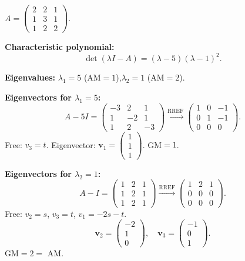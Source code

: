 \documentclass[12pt,a3paper]{article}
\begin{document}
 
\begin{tcolorbox}[enhanced,breakable,
  colback=cE!4,colframe=cE,boxrule=0.8pt,arc=5pt,
  title={\textbf{Answer --- Eigenvalues, Eigenvectors \& Diagonalizability}},
  fonttitle=\bfseries\color{white},colbacktitle=cE]
 
$A=\begin{pmatrix}2&2&1\\1&3&1\\1&2&2\end{pmatrix}$.
 
\textbf{Characteristic polynomial:}
\[
\det(\lambda I-A) = (\lambda-5)(\lambda-1)^2.
\]
 
\textbf{Eigenvalues:} $\lambda_1=5$ (AM$=1$),\quad $\lambda_2=1$ (AM$=2$).
 
\medskip
\textbf{Eigenvectors for $\lambda_1=5$:}
\[
A-5I=\begin{pmatrix}-3&2&1\\1&-2&1\\1&2&-3\end{pmatrix}
\xrightarrow{\mathrm{RREF}}
\begin{pmatrix}1&0&-1\\0&1&-1\\0&0&0\end{pmatrix}.
\]
Free: $v_3=t$. Eigenvector: $\mathbf{v}_1=\begin{pmatrix}1\\1\\1\end{pmatrix}$. GM$=1$.
 
\medskip
\textbf{Eigenvectors for $\lambda_2=1$:}
\[
A-I=\begin{pmatrix}1&2&1\\1&2&1\\1&2&1\end{pmatrix}
\xrightarrow{\mathrm{RREF}}
\begin{pmatrix}1&2&1\\0&0&0\\0&0&0\end{pmatrix}.
\]
Free: $v_2=s$, $v_3=t$, $v_1=-2s-t$.
\[
\mathbf{v}_2=\begin{pmatrix}-2\\1\\0\end{pmatrix},\quad
\mathbf{v}_3=\begin{pmatrix}-1\\0\\1\end{pmatrix}.
\]
GM$=2 =$ AM. \checkmark
 

\end{tcolorbox}
\end{document}

